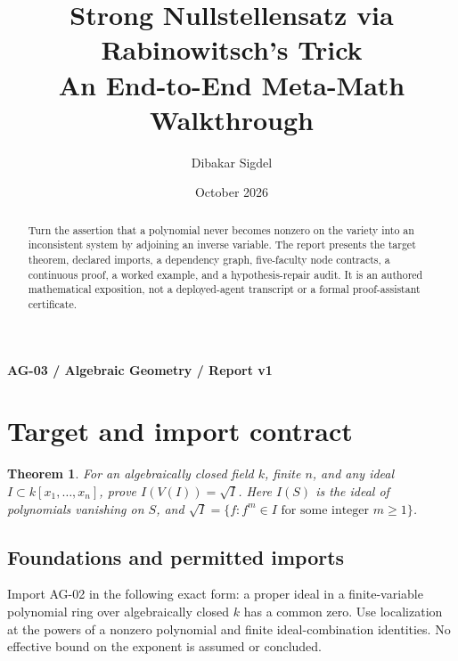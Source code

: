 \documentclass[preprint,12pt,aps,pra,showkeys,amsmath,amssymb,superscriptaddress,floatfix]{revtex4-2}
\newtheorem{theorem}{Theorem}[section]
\theoremstyle{definition}
\theoremstyle{remark}
\begin{document}
\title{Strong Nullstellensatz via Rabinowitsch's Trick\\[4pt]\large An End-to-End Meta-Math Walkthrough}

\author{Dibakar Sigdel}


\date{October 2026}

\begin{abstract}

Turn the assertion that a polynomial never becomes nonzero on the
variety into an inconsistent system by adjoining an inverse variable.
The report presents the target theorem, declared imports, a dependency
graph, five-faculty node contracts, a continuous proof, a worked
example, and a hypothesis-repair audit. It is an authored mathematical
exposition, not a deployed-agent transcript or a formal proof-assistant
certificate.

\end{abstract}\maketitle\linespread{1.12}\selectfont

\noindent\textbf{AG-03 / Algebraic Geometry / Report v1}

\section{Target and import contract}

\begin{theorem}

For an algebraically closed field \(k\), finite \(n\), and any ideal
\(I\subset k[x_1,\ldots,x_n]\), prove \(I(V(I))=\sqrt I\). Here \(I(S)\)
is the ideal of polynomials vanishing on \(S\), and
\(\sqrt I=\{f:f^m\in I\text{ for some integer }m\ge1\}\).

\end{theorem}

\subsection{Foundations and permitted imports}

Import AG-02 in the following exact form: a proper ideal in a
finite-variable polynomial ring over algebraically closed \(k\) has a
common zero. Use localization at the powers of a nonzero polynomial and
finite ideal-combination identities. No effective bound on the exponent
is assumed or concluded.
\end{document}
